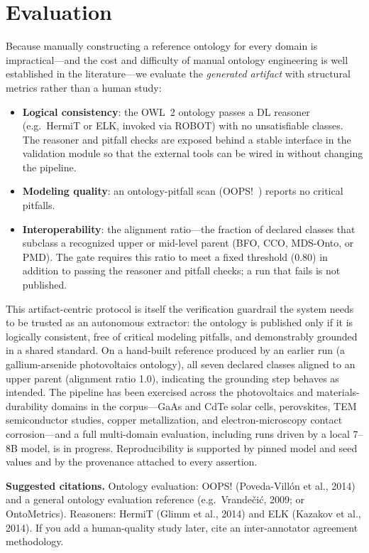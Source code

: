 \documentclass[Afour,sageh,times]{sagej}
\newcommand{\readingnote}[1]{%
  \par\smallskip\noindent\colorbox{gray!12}{%
  \parbox{\dimexpr\linewidth-2\fboxsep}{\footnotesize\textbf{Suggested citations.} #1}}\par}
\begin{document}
\section{Evaluation}
Because manually constructing a reference ontology for every domain is impractical---and the cost
and difficulty of manual ontology engineering is well established in the literature---we evaluate
the \emph{generated artifact} with structural metrics rather than a human study:
\begin{itemize}[itemsep=2pt,topsep=2pt]
  \item \textbf{Logical consistency}: the OWL~2 ontology passes a DL reasoner (e.g.\ HermiT or
        ELK, invoked via ROBOT) with no unsatisfiable classes. The reasoner and pitfall checks are
        exposed behind a stable interface in the validation module so that the external tools can be
        wired in without changing the pipeline.
  \item \textbf{Modeling quality}: an ontology-pitfall scan (OOPS!~\cite{oops2014}) reports no
        critical pitfalls.
  \item \textbf{Interoperability}: the alignment ratio---the fraction of declared classes that
        subclass a recognized upper or mid-level parent (BFO, CCO, MDS-Onto, or PMD). The gate
        requires this ratio to meet a fixed threshold (0.80) in addition to passing the reasoner and
        pitfall checks; a run that fails is not published.
\end{itemize}
This artifact-centric protocol is itself the verification guardrail the system needs to be trusted as
an autonomous extractor: the ontology is published only if it is logically consistent, free of critical
modeling pitfalls, and demonstrably grounded in a shared standard. On a hand-built reference produced by
an earlier run (a gallium-arsenide photovoltaics ontology), all seven declared classes aligned to an
upper parent (alignment ratio 1.0), indicating the grounding step behaves as intended. The pipeline has
been exercised across the photovoltaics and materials-durability domains in the corpus---GaAs and CdTe
solar cells, perovskites, TEM semiconductor studies, copper metallization, and electron-microscopy
contact corrosion---and a full multi-domain evaluation, including runs driven by a local 7--8B model, is
in progress. Reproducibility is supported by pinned model and seed values and by the provenance attached
to every assertion.
\readingnote{Ontology evaluation: OOPS! (Poveda-Vill\'on et al., 2014) and a general ontology
evaluation reference (e.g.\ Vrande\v{c}i\'c, 2009; or OntoMetrics). Reasoners: HermiT (Glimm et al.,
2014) and ELK (Kazakov et al., 2014). If you add a human-quality study later, cite an
inter-annotator agreement methodology.}
\end{document}
